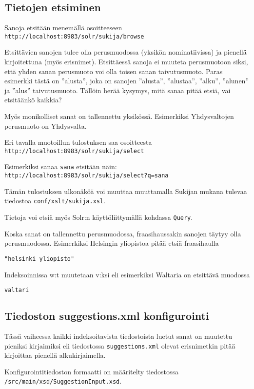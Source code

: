 \documentclass[12pt]{article}
\begin{document}
\subsection*{Tietojen etsiminen}

Sanoja etsitään menemällä osoitteeseen
\verb=http://localhost:8983/solr/sukija/browse=

Etsittävien sanojen tulee olla perusmuodossa (yksikön nominatiivissa)
ja pienellä kirjoitettuna (myös erisnimet). Etsittäessä sanoja ei
muuteta perusmuotoon siksi, että yhden sanan perusmuoto voi olla
toisen sanan taivutusmuoto. Paras esimerkki tästä on ''alusta'', joka
on sanojen ''alusta'', ''alustaa'', ''alku'', ''alunen'' ja ''alus''
taivutusmuoto. Tällöin herää kysymys, mitä sanaa pitää etsiä, vai
etsitäänkö kaikkia?

Myös monikolliset sanat on tallennettu yksikössä. Esimerkiksi
Yhdysvaltojen perusmuoto on Yhdysvalta.


Eri tavalla muotoillun tulostuksen saa osoitteesta
\verb=http://localhost:8983/solr/sukija/select=

Esimerkiksi sanaa \verb=sana= etsitään näin:
\verb|http://localhost:8983/solr/sukija/select?q=sana|

Tämän tulostuksen ulkonäköä voi muuttaa muuttamalla Sukijan mukana
tulevaa tiedostoa \verb=conf/xslt/sukija.xsl=.

Tietoja voi etsiä myös Solr:n käyttöliittymällä kohdassa \verb|Query|.


Koska sanat on tallennettu perusmuodossa, fraasihaussakin sanojen
täytyy olla perusmuodossa. Esimerkiksi Helsingin yliopistoa pitää
etsiä fraasihaulla

\verb="helsinki yliopisto"=

Indeksoinnissa w:t muutetaan v:ksi eli esimerkiksi Waltaria on etsittävä muodossa

\verb=valtari=


\subsection*{Tiedoston suggestions.xml konfigurointi}

Tässä vaiheessa kaikki indeksoitavista tiedostoista luetut sanat on
muutettu pieniksi kirjaimiksi eli tiedostossa
\verb|suggestions.xml| olevat erisnimetkin pitää kirjoittaa
pienellä alkukirjaimella.

Konfigurointitiedoston formaatti on määritelty tiedostossa
\verb=/src/main/xsd/SuggestionInput.xsd=.
\end{document}
